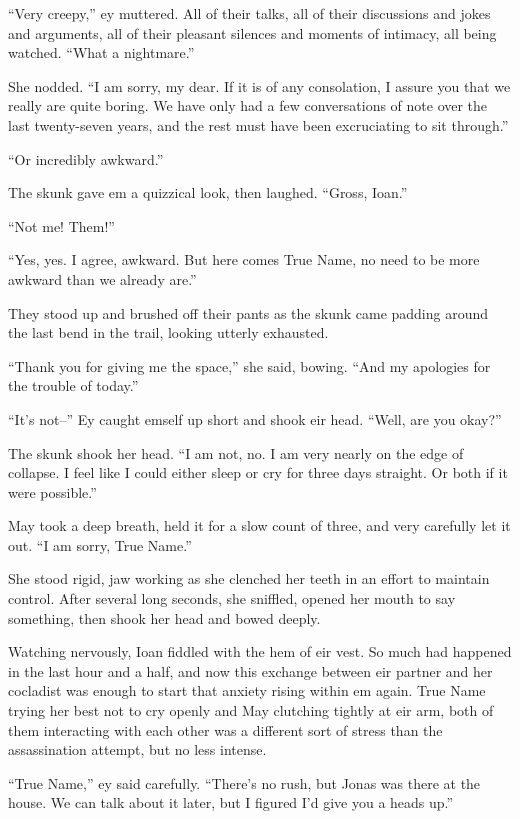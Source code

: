 ``Very creepy,'' ey muttered. All of their talks, all of their discussions and jokes and arguments, all of their pleasant silences and moments of intimacy, all being watched. ``What a nightmare.''

She nodded. ``I am sorry, my dear. If it is of any consolation, I assure you that we really are quite boring. We have only had a few conversations of note over the last twenty-seven years, and the rest must have been excruciating to sit through.''

``Or incredibly awkward.''

The skunk gave em a quizzical look, then laughed. ``Gross, Ioan.''

``Not me! Them!''

``Yes, yes. I agree, awkward. But here comes True Name, no need to be more awkward than we already are.''

They stood up and brushed off their pants as the skunk came padding around the last bend in the trail, looking utterly exhausted.

``Thank you for giving me the space,'' she said, bowing. ``And my apologies for the trouble of today.''

``It's not--'' Ey caught emself up short and shook eir head. ``Well, are you okay?''

The skunk shook her head. ``I am not, no. I am very nearly on the edge of collapse. I feel like I could either sleep or cry for three days straight. Or both if it were possible.''

May took a deep breath, held it for a slow count of three, and very carefully let it out. ``I am sorry, True Name.''

She stood rigid, jaw working as she clenched her teeth in an effort to maintain control. After several long seconds, she sniffled, opened her mouth to say something, then shook her head and bowed deeply.

Watching nervously, Ioan fiddled with the hem of eir vest. So much had happened in the last hour and a half, and now this exchange between eir partner and her cocladist was enough to start that anxiety rising within em again. True Name trying her best not to cry openly and May clutching tightly at eir arm, both of them interacting with each other was a different sort of stress than the assassination attempt, but no less intense.

``True Name,'' ey said carefully. ``There's no rush, but Jonas was there at the house. We can talk about it later, but I figured I'd give you a heads up.''

